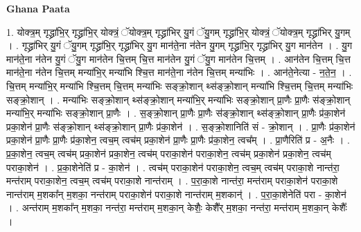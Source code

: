 \documentclass[17pt]{extarticle}
\begin{document}
\textbf{Ghana Paata } \newline

1. योक्त्र॒म् गृद्ध्रा॑भि॒र् गृद्ध्रा॑भि॒र् योक्त्रं॒ ॅयोक्त्र॒म् गृद्ध्रा॑भिर् यु॒गं ॅयु॒गम् गृद्ध्रा॑भि॒र् योक्त्रं॒ ॅयोक्त्र॒म् गृद्ध्रा॑भिर् यु॒गम् । . गृद्ध्रा॑भिर् यु॒गं ॅयु॒गम् गृद्ध्रा॑भि॒र् गृद्ध्रा॑भिर् यु॒ग मान॑ते॒ना न॑तेन यु॒गम् गृद्ध्रा॑भि॒र् गृद्ध्रा॑भिर् यु॒ग मान॑तेन । . यु॒ग मान॑ते॒ना न॑तेन यु॒गं ॅयु॒ग मान॑तेन चि॒त्तम् चि॒त्त मान॑तेन यु॒गं ॅयु॒ग मान॑तेन चि॒त्तम् । . आन॑तेन चि॒त्तम् चि॒त्त मान॑ते॒ना न॑तेन चि॒त्तम् मन्या॑भि॒र् मन्या॑भि श्चि॒त्त मान॑ते॒ना न॑तेन चि॒त्तम् मन्या॑भिः । . आन॑ते॒नेत्या - न॒ते॒न॒ । . चि॒त्तम् मन्या॑भि॒र् मन्या॑भि श्चि॒त्तम् चि॒त्तम् मन्या॑भिः सङ्क्रो॒शान् थ्स॑ङ्क्रो॒शान् मन्या॑भि श्चि॒त्तम् चि॒त्तम् मन्या॑भिः सङ्क्रो॒शान् । . मन्या॑भिः सङ्क्रो॒शान् थ्स॑ङ्क्रो॒शान् मन्या॑भि॒र् मन्या॑भिः सङ्क्रो॒शान् प्रा॒णैः प्रा॒णैः स॑ङ्क्रो॒शान् मन्या॑भि॒र् मन्या॑भिः सङ्क्रो॒शान् प्रा॒णैः । . स॒ङ्क्रो॒शान् प्रा॒णैः प्रा॒णैः स॑ङ्क्रो॒शान् थ्स॑ङ्क्रो॒शान् प्रा॒णैः प्र॑का॒शेन॑ प्रका॒शेन॑ प्रा॒णैः स॑ङ्क्रो॒शान् थ्स॑ङ्क्रो॒शान् प्रा॒णैः प्र॑का॒शेन॑ । . स॒ङ्क्रो॒शानिति॑ सं - क्रो॒शान् । . प्रा॒णैः प्र॑का॒शेन॑ प्रका॒शेन॑ प्रा॒णैः प्रा॒णैः प्र॑का॒शेन॒ त्वच॒म् त्वच॑म् प्रका॒शेन॑ प्रा॒णैः प्रा॒णैः प्र॑का॒शेन॒ त्वच᳚म् । . प्रा॒णैरिति॑ प्र - अ॒नैः । . प्र॒का॒शेन॒ त्वच॒म् त्वच॑म् प्रका॒शेन॑ प्रका॒शेन॒ त्वच॑म् पराका॒शेन॑ पराका॒शेन॒ त्वच॑म् प्रका॒शेन॑ प्रका॒शेन॒ त्वच॑म् पराका॒शेन॑ । . प्र॒का॒शेनेति॑ प्र - का॒शेन॑ । . त्वच॑म् पराका॒शेन॑ पराका॒शेन॒ त्वच॒म् त्वच॑म् पराका॒शे नान्त॑रा॒ मन्त॑राम् पराका॒शेन॒ त्वच॒म् त्वच॑म् पराका॒शे नान्त॑राम् । . प॒रा॒का॒शे नान्त॑रा॒ मन्त॑राम् पराका॒शेन॑ पराका॒शे नान्त॑राम् म॒शका᳚न् म॒शका॒ नन्त॑राम् पराका॒शेन॑ पराका॒शे नान्त॑राम् म॒शकान्॑ । . प॒रा॒का॒शेनेति॑ परा - का॒शेन॑ । . अन्त॑राम् म॒शका᳚न् म॒शका॒ नन्त॑रा॒ मन्त॑राम् म॒शका॒न् केशैः॒ केशै᳚र् म॒शका॒ नन्त॑रा॒ मन्त॑राम् म॒शका॒न् केशैः᳚ । \newline
\end{document}
